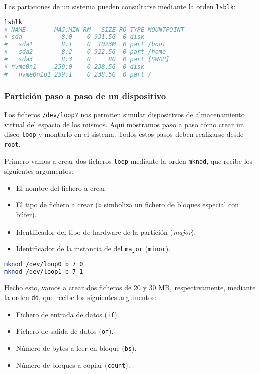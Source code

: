 Las particiones de un sistema pueden consultarse mediante la orden \texttt{lsblk}:

\begin{lstlisting}[language=Bash]
lsblk
# NAME        MAJ:MIN RM   SIZE RO TYPE MOUNTPOINT
# sda           8:0    0 931.5G  0 disk
#   sda1        8:1    0  1023M  0 part /boot
#   sda2        8:2    0 922.5G  0 part /home
#   sda3        8:3    0     8G  0 part [SWAP]
# nvme0n1     259:0    0 238.5G  0 disk
#   nvme0n1p1 259:1    0 238.5G  0 part /
\end{lstlisting}

\subsubsection{Partición paso a paso de un dispositivo}

Los ficheros \texttt{/dev/loop?} nos permiten simular dispositivos de almacenamiento virtual del espacio de los mismos.
Aquí mostramos paso a paso cómo crear un disco \texttt{loop} y montarlo en el sistema.
Todos estos pasos deben realizarse desde \texttt{root}.

Primero vamos a crear dos ficheros \texttt{loop} mediante la orden \texttt{mknod}, que recibe los siguientes argumentos:

\begin{itemize}
	\item El nombre del fichero a crear
	\item El tipo de fichero a crear (\texttt{b} simboliza un fichero de bloques especial con búfer).
	\item Identificador del tipo de hardware de la partición (\emph{major}).
	\item Identificador de la instancia de del \texttt{major} (\texttt{minor}).
\end{itemize}

\begin{lstlisting}[language=Bash]
mknod /dev/loop0 b 7 0
mknod /dev/loop1 b 7 1
\end{lstlisting}

Hecho esto, vamos a crear dos ficheros de 20 y 30 MB, respectivamente, mediante la orden \texttt{dd}, que recibe los siguientes argumentos:

\begin{itemize}
	\item Fichero de entrada de datos (\texttt{if}).
	\item Fichero de salida de datos (\texttt{of}).
	\item Número de bytes a leer en bloque (\texttt{bs}).
	\item Número de bloques a copiar (\texttt{count}).
\end{itemize}

